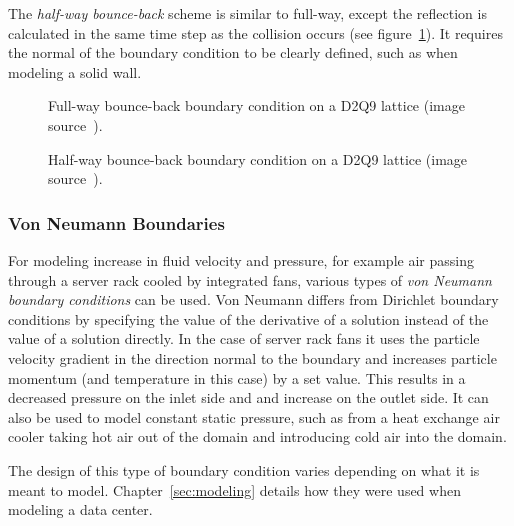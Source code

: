 The \textit{half-way bounce-back} scheme  is similar to full-way, except the reflection is calculated in the same time step as the collision occurs (see figure~\ref{fig:bounce-back-hw}). It requires the normal of the boundary condition to be clearly defined, such as when modeling a solid wall.

\begin{figure}[!htb]
\centering
\begin{minipage}[t]{.25\textwidth}
	\centering
	\begin{scriptsize}
	\def\svgwidth{0.9\linewidth}
	
	\end{scriptsize}
	\caption{Full-way bounce-back boundary condition on a D2Q9 lattice (image source~\cites[pg.64]{Delbosc}).}
	\label{fig:bounce-back-fw}
\end{minipage}\qquad%
\begin{minipage}[t]{.25\textwidth}
	\centering
	\begin{scriptsize}
	\def\svgwidth{0.9\linewidth}
	
	\end{scriptsize}
	\caption{Half-way bounce-back boundary condition on a D2Q9 lattice (image source~\cites[pg.64]{Delbosc}).}
	\label{fig:bounce-back-hw}
\end{minipage}
\end{figure}

\subsubsection{Von Neumann Boundaries}
For modeling increase in fluid velocity and pressure, for example air passing through a server rack cooled by integrated fans, various types of \textit{von Neumann boundary conditions} can be used. Von Neumann differs from Dirichlet boundary conditions by specifying the value of the derivative of a solution instead of the value of a solution directly. In the case of server rack fans it uses the particle velocity gradient in the direction normal to the boundary and increases particle momentum (and temperature in this case) by a set value. This results in a decreased pressure on the inlet side and and increase on the outlet side. It can also be used to model constant static pressure, such as from a heat exchange air cooler taking hot air out of the domain and introducing cold air into the domain.

The design of this type of boundary condition varies depending on what it is meant to model. Chapter~\ref{sec:modeling} details how they were used when modeling a data center.


